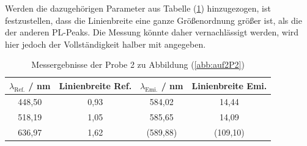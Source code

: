 Werden die dazugeh\"{o}rigen Parameter aus Tabelle (\ref{tab:auf2b}) hinzugezogen, ist festzustellen, dass die Linienbreite eine ganze Gr\"{o}{\ss}enordnung gr\"{o}{\ss}er ist, als die der anderen PL-Peaks.
Die Messung k\"{o}nnte daher vernachl\"{a}ssigt werden, wird hier jedoch der Vollst\"{a}ndigkeit halber mit angegeben.
\begin{table}
	\centering
	\caption{Messergebnisse der Probe 2 zu Abbildung (\ref{abb:auf2P2})}
\begin{tabular}{|cccc|}
	\hline
	{$\lambda_{\text{Ref.}}$ / nm}	&	{Linienbreite Ref.}	&	{$\lambda_{\text{Emi.}}$ / nm}	&	{Linienbreite Emi.}	\\
	\hline
	448,50 & 0,93 & 584,02 & 14,44 \\
	518,19 & 1,05 & 585,65 & 14,09 \\
	636,97 & 1,62 & (589,88) & (109,10) \\
	\hline
	\end{tabular}
\label{tab:auf2b}
\end{table}

